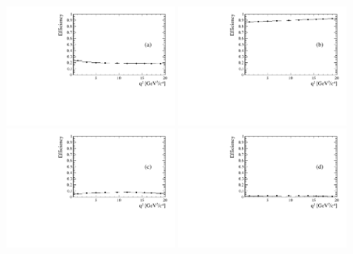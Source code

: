 	

\begin{figure}
\centering
\includegraphics[width=0.49\textwidth]{Lmumu/figs/efficiencies/BR/effvsq2_DD_geom.pdf}
\includegraphics[width=0.49\textwidth]{Lmumu/figs/efficiencies/BR/effvsq2_DD_det.pdf}
\includegraphics[width=0.49\textwidth]{Lmumu/figs/efficiencies/BR/effvsq2_DD_reco.pdf}
\includegraphics[width=0.49\textwidth]{Lmumu/figs/efficiencies/BR/effvsq2_LL_reco.pdf}

\end{figure}
